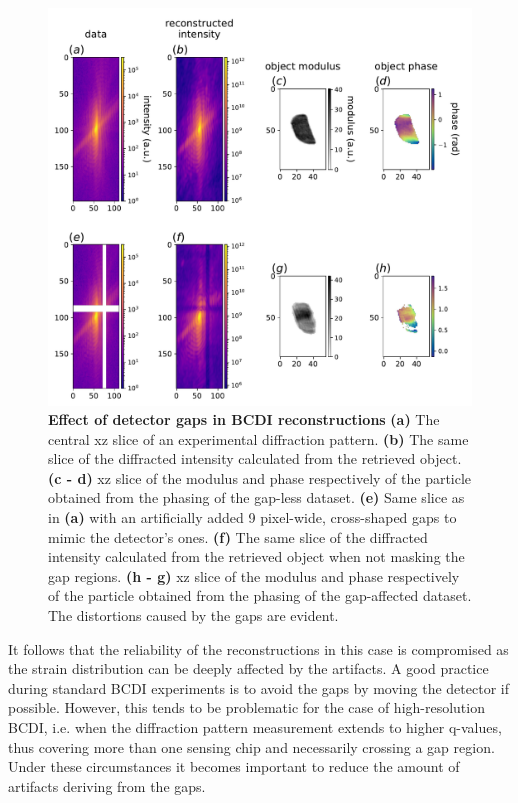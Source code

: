 \begin{figure}[h]
    \includegraphics[width=\textwidth]{figures/Inpainting/gaps_intropdf.pdf}
    \caption{\textbf{Effect of detector gaps in BCDI reconstructions} 
    \textbf{(a)} The central xz slice of an experimental diffraction pattern. \textbf{(b)} The same slice of the diffracted
    intensity calculated from the retrieved object. \textbf{(c - d)} xz slice of the modulus and phase respectively of the particle
    obtained from the phasing of the gap-less dataset. \textbf{(e)} Same slice as in \textbf{(a)} with an artificially added
    9 pixel-wide, cross-shaped gaps to mimic the detector's ones. \textbf{(f)} The same slice of the diffracted
    intensity calculated from the retrieved object when not masking the gap regions. \textbf{(h - g)} xz slice of the modulus and phase respectively of the particle
    obtained from the phasing of the gap-affected dataset. The distortions caused by the gaps are evident. }
    \label{fig:gap_intro}
    \end{figure}


It follows that the reliability of the reconstructions in this case is 
compromised as the strain distribution can be deeply affected by the artifacts. A good practice during standard BCDI experiments
is to avoid the gaps by moving the detector if possible. However, this tends to be problematic for the case of high-resolution BCDI, 
i.e. when the diffraction pattern measurement extends to higher q-values, thus covering more than one sensing 
chip and necessarily crossing a gap region. Under these circumstances it becomes important to reduce the amount of
artifacts deriving from the gaps. 


